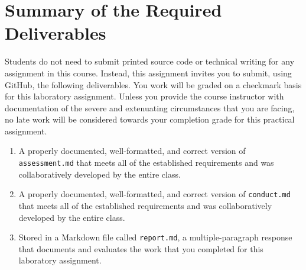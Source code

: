\documentclass[11pt]{article}
\newcommand{\assessment}{\lstinline{assessment.md}}
\newcommand{\conduct}{\lstinline{conduct.md}}
\newcommand{\reflection}{\lstinline{report.md}}
\begin{document}
\section*{Summary of the Required Deliverables}

\noindent Students do not need to submit printed source code or technical
writing for any assignment in this course. Instead, this assignment invites you
to submit, using GitHub, the following deliverables. You work will be graded on
a checkmark basis for this laboratory assignment.
%
Unless you provide the course instructor with documentation of the severe and
extenuating circumstances that you are facing, no late work will be considered
towards your completion grade for this practical assignment.

\begin{enumerate}

\setlength{\itemsep}{0in}

\item A properly documented, well-formatted, and correct version of
  \assessment{} that meets all of the established requirements and was
  collaboratively developed by the entire class.

\item A properly documented, well-formatted, and correct version of
  \conduct{} that meets all of the established requirements and was
  collaboratively developed by the entire class.

\item Stored in a Markdown file called \reflection{}, a multiple-paragraph
  response that documents and evaluates the work that you completed for this
  laboratory assignment.

\end{enumerate}
\end{document}
